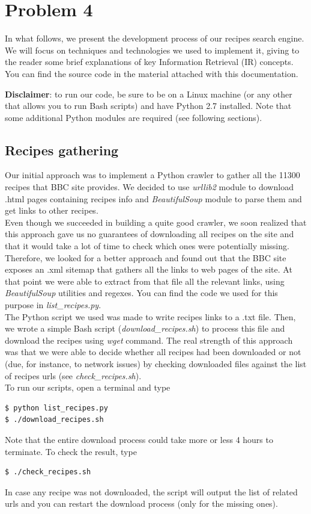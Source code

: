 
\section{Problem 4}

In what follows, we present the development process of our recipes search engine. We will focus on techniques and technologies we used to implement it, giving to the reader some brief explanations of key Information Retrieval (IR) concepts. You can find the source code in the material attached with this documentation.\medskip

\noindent\textbf{Disclaimer}: to run our code, be sure to be on a Linux machine (or any other that allows you to run Bash scripts) and have Python 2.7 installed. Note that some additional Python modules are required (see following sections).


\subsection{Recipes gathering}

Our initial approach was to implement a Python crawler to gather all the 11300 recipes that BBC site\cite{bbc} provides. We decided to use \textit{urllib2}\cite{urllib2} module to download .html pages containing recipes info and \textit{BeautifulSoup}\cite{beaut_soup} module to parse them and get links to other recipes.\\
Even though we succeeded in building a quite good crawler, we soon realized that this approach gave us no guarantees of downloading all recipes on the site and that it would take a lot of time to check which ones were potentially missing. Therefore, we looked for a better approach and found out that the BBC site exposes an .xml sitemap that gathers all the links to web pages of the site. At that point we were able to extract from that file all the relevant links, using \textit{BeautifulSoup}\cite{beaut_soup} utilities and regexes. You can find the code we used for this purpose in \textit{list\_recipes.py}.\\
The Python script we used was made to write recipes links to a .txt file. Then, we wrote a simple Bash script (\textit{download\_recipes.sh}) to process this file and download the recipes using \textit{wget} command. The real strength of this approach was that we were able to decide whether all recipes had been downloaded or not (due, for instance, to network issues) by checking downloaded files against the list of recipes urls (see \textit{check\_recipes.sh}).\\
To run our scripts, open a terminal and type
\begin{lstlisting}
$ python list_recipes.py
$ ./download_recipes.sh
\end{lstlisting}
Note that the entire download process could take more or less 4 hours to terminate. To check the result, type
\begin{lstlisting}
$ ./check_recipes.sh
\end{lstlisting}
In case any recipe was not downloaded, the script will output the list of related urls and you can restart the download process (only for the missing ones).


